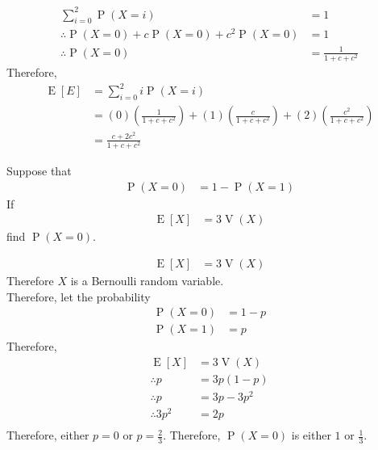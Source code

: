 \documentclass[fleqn, a4paper, 11pt, oneside]{amsart}
\theoremstyle{definition}
\theoremstyle{theorem}
\DeclareMathOperator{\prob}{\mathrm{P}}
\DeclareMathOperator{\expct}{\mathrm{E}}
\DeclareMathOperator{\var}{\mathrm{V}}
\begin{document}
\begin{solution}
	\begin{align*}
		\sum\limits_{i = 0}^{2} \prob(X = i)                        & = 1 \\
		\therefore \prob(X = 0) + c \prob(X = 0) + c^2 \prob(X = 0) & = 1 \\
		\therefore \prob(X = 0)                                     & = \frac{1}{1 + c + c^2}
	\end{align*}
	Therefore,
	\begin{align*}
		\expct[E] & = \sum\limits_{i = 0}^{2} i \prob(X = i)                                                                                           \\
                          & = (0) \left( \frac{1}{1 + c + c^2} \right) + (1) \left( \frac{c}{1 + c + c^2} \right) + (2) \left( \frac{c^2}{1 + c + c^2} \right) \\
                          & = \frac{c + 2 c^2}{1 + c + c^2}
	\end{align*}
\end{solution}

\begin{question}
	Suppose that
	\begin{align*}
		\prob(X = 0) & = 1 - \prob(X = 1)
	\end{align*}
	If
	\begin{align*}
		\expct[X] & = 3 \var(X)
	\end{align*}
	find $\prob(X = 0)$.
\end{question}

\begin{solution}
	\begin{align*}
		\expct[X] & = 3 \var(X)
	\end{align*}
	Therefore $X$ is a Bernoulli random variable.\\
	Therefore, let the probability
	\begin{align*}
		\prob(X = 0) & = 1 - p \\
		\prob(X = 1) & = p
	\end{align*}
	Therefore,
	\begin{align*}
		\expct[X]        & = 3 \var(X)   \\
		\therefore p     & = 3 p (1 - p) \\
		\therefore p     & = 3 p - 3 p^2 \\
		\therefore 3 p^2 & = 2 p         \\
	\end{align*}
	Therefore, either $p = 0$ or $p = \frac{2}{3}$.
	Therefore, $\prob(X = 0)$ is either $1$ or $\frac{1}{3}$.
\end{solution}
\end{document}

